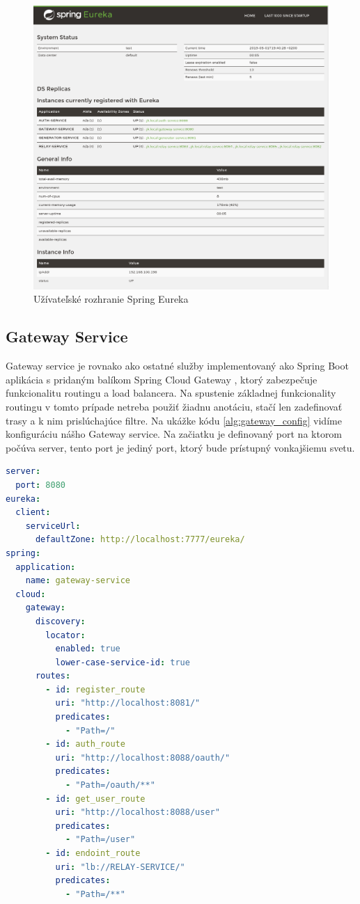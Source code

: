 \begin{figure}[!htbp]
	\centering
	\includegraphics[width=16cm]{img/eureka_gui.png}
	\caption{Užívateľské rozhranie Spring Eureka}
	\label{eureka_gui}
\end{figure}

\subsection{Gateway Service}
Gateway service je rovnako ako ostatné služby implementovaný ako Spring Boot aplikácia s pridaným balíkom Spring Cloud Gateway \cite{cloud_gateway}, ktorý zabezpečuje funkcionalitu routingu a load balancera.
Na spustenie základnej funkcionality routingu v tomto prípade netreba použiť žiadnu anotáciu, stačí len zadefinovať trasy a k nim prislúchajúce filtre. Na ukážke kódu \ref{alg:gateway_config} vidíme konfiguráciu nášho Gateway service. Na začiatku je definovaný port na ktorom počúva server, tento port je jediný port, ktorý bude prístupný vonkajšiemu svetu.

\begin{lstlisting}[float, caption={Konfigurácia Gateway service},label={alg:gateway_config},language=yaml]
server:
  port: 8080
eureka:
  client:
    serviceUrl:
      defaultZone: http://localhost:7777/eureka/
spring:
  application:
    name: gateway-service
  cloud:
    gateway:
      discovery:
        locator:
          enabled: true
          lower-case-service-id: true
      routes:
        - id: register_route
          uri: "http://localhost:8081/"
          predicates:
            - "Path=/"
        - id: auth_route
          uri: "http://localhost:8088/oauth/"
          predicates:
            - "Path=/oauth/**"
        - id: get_user_route
          uri: "http://localhost:8088/user"
          predicates:
            - "Path=/user"
        - id: endoint_route
          uri: "lb://RELAY-SERVICE/"
          predicates:
            - "Path=/**"
\end{lstlisting}


